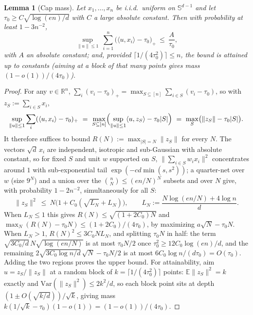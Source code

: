 \documentclass[11pt,reqno]{amsart}
\theoremstyle{plain}
\newtheorem{lemma}[theorem]{Lemma}
\theoremstyle{definition}
\theoremstyle{remark}
\newcommand{\R}{\mathbb{R}}
\newcommand{\Sd}{\mathbb{S}^{d-1}}
\newcommand{\EE}{\mathbb{E}}
\newcommand{\inn}[2]{\langle #1,#2\rangle}
\begin{document}
\begin{lemma}[Cap mass]\label{lem:capmass}
Let $x_1,\dots,x_n$ be i.i.d.\ uniform on $\Sd$ and let $\tau_0\ge C\sqrt{\log(en)/d}$ with $C$ a large absolute constant. Then with probability at least $1-3n^{-2}$,
\[
\sup_{\|u\|\le1}\ \sum_{i=1}^n\bigl(\inn u{x_i}-\tau_0\bigr)_+\ \le\ \frac A{\tau_0},
\]
with $A$ an absolute constant; and, provided $\lceil1/(4\tau_0^2)\rceil\le n$, the bound is attained up to constants (aiming at a block of that many points gives mass $(1-o(1))/(4\tau_0)$).
\end{lemma}
\begin{proof}[Proof]
For any $v\in\R^n$, $\sum_i(v_i-\tau_0)_+=\max_{S\subseteq[n]}\sum_{i\in S}(v_i-\tau_0)$, so with $z_S:=\sum_{i\in S}x_i$,
\[
\sup_{\|u\|\le1}\sum_i(\inn u{x_i}-\tau_0)_+\ =\ \max_{S\subseteq[n]}\Bigl(\sup_{\|u\|\le1}\inn u{z_S}-\tau_0|S|\Bigr)\ =\ \max_{S}\bigl(\|z_S\|-\tau_0|S|\bigr).
\]
It therefore suffices to bound $R(N):=\max_{|S|=N}\|z_S\|$ for every $N$. The vectors $\sqrt d\,x_i$ are independent, isotropic and sub-Gaussian with absolute constant, so for fixed $S$ and unit $w$ supported on $S$, $\|\sum_{i\in S}w_ix_i\|^2$ concentrates around $1$ with sub-exponential tail $\exp(-cd\min(s,s^2))$; a quarter-net over $w$ (size $9^N$) and a union over the $\binom nN\le(en/N)^N$ subsets and over $N$ give, with probability $1-2n^{-2}$, simultaneously for all $S$:
\[
\|z_S\|^2\ \le\ N\bigl(1+C_0(\sqrt{L_N}+L_N)\bigr),\qquad L_N:=\frac{N\log(en/N)+4\log n}{d}.
\]
When $L_N\le1$ this gives $R(N)\le\sqrt{(1+2C_0)N}$ and $\max_N(R(N)-\tau_0N)\le(1+2C_0)/(4\tau_0)$, by maximizing $a\sqrt N-\tau_0N$. When $L_N>1$, $R(N)^2\le3C_0NL_N$, and splitting $\tau_0N$ in half: the term $\sqrt{3C_0/d}\,N\sqrt{\log(en/N)}$ is at most $\tau_0N/2$ once $\tau_0^2\ge12C_0\log(en)/d$, and the remaining $2\sqrt{3C_0\log n/d}\,\sqrt N-\tau_0N/2$ is at most $6C_0\log n/(d\tau_0)=O(\tau_0)$. Adding the two regions proves the upper bound. For attainability, aim $u=z_S/\|z_S\|$ at a random block of $k=\lceil1/(4\tau_0^2)\rceil$ points: $\EE\|z_S\|^2=k$ exactly and $\mathrm{Var}(\|z_S\|^2)\le2k^2/d$, so each block point sits at depth $(1\pm O(\sqrt{k/d}))/\sqrt k$, giving mass $k(1/\sqrt k-\tau_0)(1-o(1))=(1-o(1))/(4\tau_0)$.
\end{proof}
\end{document}
